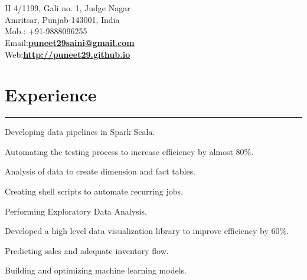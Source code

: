 \documentclass[]{puneet-resume}
\begin{document}
\hfill
\begin{minipage}[t]{0.66\textwidth}
\hspace*{0pt}\hfill    \\
\hspace*{0pt}\hfill    \\
\hspace*{0pt}\hfill H 4/1199, Gali no. 1, Judge Nagar \\
\hspace*{0pt}\hfill Amritsar, Punjab-143001, India \\
\hspace*{0pt}\hfill Mob.: +91-9888096255 \\
\hspace*{0pt}\hfill Email:\textbf{\href{mailto:puneet29saini@gmail.com}{puneet29saini@gmail.com}} \\
\hspace*{0pt}\hfill Web:\textbf{\href{http://puneet29.github.io}{http://puneet29.github.io}} 
\section{Experience}
\noindent\rule{12.5cm}{0.4pt}
 
\noindent
\hspace{5em}%
\begin{tightemize}
\begin{minipage}{0.85\textwidth\vspace{2pt}}
	\item Developing data pipelines in Spark Scala.
	\item Automating the testing process to increase efficiency by almost 80\%.
	\item Analysis of data to create dimension and fact tables.
	\item Creating shell scripts to automate recurring jobs.
\end{minipage}
\end{tightemize}
\sectionsep

 
\noindent
\hspace{5em}%
\begin{tightemize}
\begin{minipage}{0.85\textwidth\vspace{2pt}}
	\item Performing Exploratory Data Analysis.
	\item Developed a high level data visualization library to improve efficiency by 60\%.
	\item Predicting sales and adequate inventory flow.
	\item Building and optimizing machine learning models.
\end{minipage}
\end{tightemize}
\sectionsep


\end{minipage}
\end{document}

